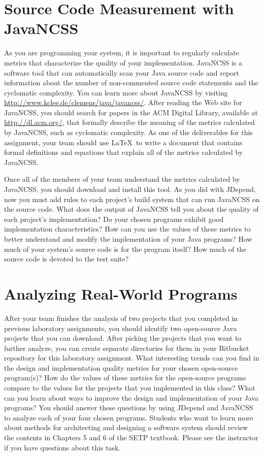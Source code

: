 \section*{Source Code Measurement with JavaNCSS}

As you are programming your system, it is important to regularly calculate metrics that characterize the quality of
your implementation.  JavaNCSS is a software tool that can automatically scan your Java source code and report
information about the number of non-commented source code statements and the cyclomatic complexity.  You can learn more
about JavaNCSS by visiting \url{http://www.kclee.de/clemens/java/javancss/}. After reading the Web site for JavaNCSS,
you should search for papers in the ACM Digital Library, available at \url{http://dl.acm.org/}, that formally describe
the meaning of the metrics calculated by JavaNCSS, such as cyclomatic complexity. As one of the deliverables for this
assignment, your team should use \LaTeX\ to write a document that contains formal definitions and equations that explain
all of the metrics calculated by JavaNCSS.

Once all of the members of your team understand the metrics calculated by JavaNCSS, you should download and install
this tool.  As you did with JDepend, now you must add rules to each project's build system that can run JavaNCSS on the
source code. What does the output of JavaNCSS tell you about the quality of each project's implementation? Do your
chosen programs exhibit good implementation characteristics? How can you use the values of these metrics to better
understand and modify the implementation of your Java programs? How much of your system's source code is for the
program itself? How much of the source code is devoted to the test suite?

\section*{Analyzing Real-World Programs}

After your team finishes the analysis of two projects that you completed in previous laboratory assignments, you should
identify two open-source Java projects that you can download.  After picking the projects that you want to further
analyze, you can create separate directories for them in your Bitbucket repository for this laboratory assignment.  What
interesting trends can you find in the design and implementation quality metrics for your chosen open-source program(s)?
How do the values of these metrics for the open-source programs compare to the values for the projects that you
implemented in this class?  What can you learn about ways to improve the design and implementation of your Java
programs? You should answer these questions by using JDepend and JavaNCSS to analyze each of your four chosen programs.
Students who want to learn more about methods for architecting and designing a software system should review the
contents in Chapters 5 and 6 of the SETP textbook. Please see the instructor if you have questions about this task.

